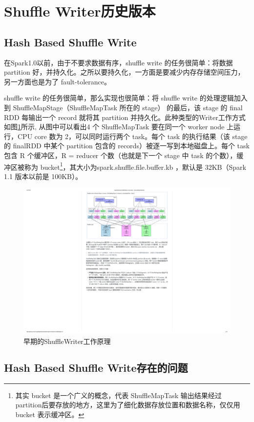 \section{Shuffle Writer历史版本}
\subsection{Hash Based Shuffle Write}
在Spark1.0以前，由于不要求数据有序，shuffle write 的任务很简单：将数据 partition 好，并持久化。之所以要持久化，一方面是要减少内存存储空间压力，另一方面也是为了 fault-tolerance。

shuffle write 的任务很简单，那么实现也很简单：将 shuffle write 的处理逻辑加入到 ShuffleMapStage（ShuffleMapTask 所在的 stage） 的最后，该 stage 的 final RDD 每输出一个 record 就将其 partition 并持久化。此种类型的Writer工作方式如图\ref{fig:hashShuffleWriter}所示, 从图中可以看出4 个 ShuffleMapTask 要在同一个 worker node 上运行，CPU core 数为 2，可以同时运行两个 task。每个 task 的执行结果（该 stage 的 finalRDD 中某个 partition 包含的 records）被逐一写到本地磁盘上。每个 task 包含 R 个缓冲区，R = reducer 个数（也就是下一个 stage 中 task 的个数），缓冲区被称为 bucket\footnote{其实 bucket 是一个广义的概念，代表 ShuffleMapTask 输出结果经过 partition后要存放的地方，这里为了细化数据存放位置和数据名称，仅仅用 bucket 表示缓冲区。}，其大小为spark.shuffle.file.buffer.kb ，默认是 32KB（Spark 1.1 版本以前是 100KB）。
\begin{figure}[H] 
	\centering
	\includegraphics[width=\textwidth]{figures/hashShuffleWriter.pdf}
	\caption{早期的ShuffleWriter工作原理}
	\label{fig:hashShuffleWriter}
\end{figure}
\subsection{Hash Based Shuffle Write存在的问题}

